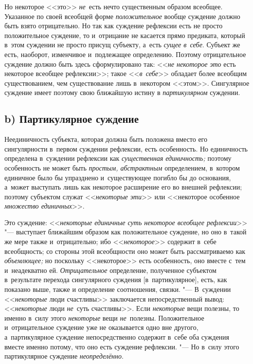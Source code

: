 Но некоторое <<это>> {\em не}~есть нечто существенным образом всеобщее.
Указанное по своей всеобщей форме {\em положительное}
вообще суждение должно быть взято отрицательно. Но так как
суждение рефлексии есть не просто положительное суждение, то и~отрицание не
касается прямо предиката, который в~этом суждении не просто присущ
субъекту, а~есть {\em сущее в~себе}.
Субъект же есть, наоборот, изменчивое и~подлежащее
определению. Поэтому отрицательное суждение должно быть здесь
сформулировано так: <<{\em не некоторое это} есть некоторое всеобщее
рефлексии>>; такое <<{\em в~себе}>>
обладает более всеобщим существованием, чем существование
лишь в~некотором <<этом>>. Сингулярное суждение имеет поэтому свою ближайшую
истину в {\em партикулярном} суждении.

\subsection[b) Партикулярное суждение]{b) Партикулярное суждение}

Неединичность субъекта, которая должна быть положена вместо его сингулярности
в~первом суждении рефлексии, есть особенность. Но единичность определена
в~суждении рефлексии как {\em существенная единичность;} поэтому особенность не
может быть {\em простым, абстрактным} определением, в~котором единичное
было бы упразднено и~существующее погибло бы до основания, а~может выступать
лишь как некоторое расширение его во внешней рефлексии; поэтому субъектом
служат <<{\em некоторые эти}>> или <<некоторое особенное
{\em множество единичных}>>.

Это суждение: <<{\em некоторые единичные суть некоторое всеобщее рефлексии}>>
"--- выступает ближайшим образом как положительное суждение, но оно в~такой же
мере также и~отрицательно; ибо <<{\em некоторое}>> содержит в~себе всеобщность;
со стороны этой всеобщности оно может быть рассматриваемо как {\em объемлющее;}
но поскольку <<некоторое>> есть особенность, оно вместе с~тем и~неадекватно ей.
{\em Отрицательное} определение, полученное субъектом в~результате перехода
сингулярного суждения [в~партикулярное], есть, как показано выше, также и
определение соотношения, связки. "--- В~суждении <<{\em некоторые} люди
счастливы>> заключается непосредственный вывод: <<{\em некоторые} люди
{\em не}~суть счастливы>>. Если {\em некоторые} вещи полезны, то именно в~силу
этого {\em некоторые} вещи {\em не}~полезны. Положительное и~отрицательное
суждение уже не оказывается одно вне другого, а~партикулярное суждение
непосредственно содержит в~себе оба суждения вместе именно потому, что
оно есть суждение рефлексии. "--- Но в~силу этого партикулярное суждение
{\em неопределённо}.

